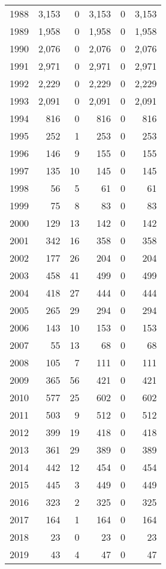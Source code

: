 \documentclass[11pt]{book}
\begin{document}
\begin{longtable}[]{@{}lrrrrr@{}}
1988 & 3,153 & 0 & 3,153 & 0 & 3,153\tabularnewline
1989 & 1,958 & 0 & 1,958 & 0 & 1,958\tabularnewline
1990 & 2,076 & 0 & 2,076 & 0 & 2,076\tabularnewline
1991 & 2,971 & 0 & 2,971 & 0 & 2,971\tabularnewline
1992 & 2,229 & 0 & 2,229 & 0 & 2,229\tabularnewline
1993 & 2,091 & 0 & 2,091 & 0 & 2,091\tabularnewline
1994 & 816 & 0 & 816 & 0 & 816\tabularnewline
1995 & 252 & 1 & 253 & 0 & 253\tabularnewline
1996 & 146 & 9 & 155 & 0 & 155\tabularnewline
1997 & 135 & 10 & 145 & 0 & 145\tabularnewline
1998 & 56 & 5 & 61 & 0 & 61\tabularnewline
1999 & 75 & 8 & 83 & 0 & 83\tabularnewline
2000 & 129 & 13 & 142 & 0 & 142\tabularnewline
2001 & 342 & 16 & 358 & 0 & 358\tabularnewline
2002 & 177 & 26 & 204 & 0 & 204\tabularnewline
2003 & 458 & 41 & 499 & 0 & 499\tabularnewline
2004 & 418 & 27 & 444 & 0 & 444\tabularnewline
2005 & 265 & 29 & 294 & 0 & 294\tabularnewline
2006 & 143 & 10 & 153 & 0 & 153\tabularnewline
2007 & 55 & 13 & 68 & 0 & 68\tabularnewline
2008 & 105 & 7 & 111 & 0 & 111\tabularnewline
2009 & 365 & 56 & 421 & 0 & 421\tabularnewline
2010 & 577 & 25 & 602 & 0 & 602\tabularnewline
2011 & 503 & 9 & 512 & 0 & 512\tabularnewline
2012 & 399 & 19 & 418 & 0 & 418\tabularnewline
2013 & 361 & 29 & 389 & 0 & 389\tabularnewline
2014 & 442 & 12 & 454 & 0 & 454\tabularnewline
2015 & 445 & 3 & 449 & 0 & 449\tabularnewline
2016 & 323 & 2 & 325 & 0 & 325\tabularnewline
2017 & 164 & 1 & 164 & 0 & 164\tabularnewline
2018 & 23 & 0 & 23 & 0 & 23\tabularnewline
2019 & 43 & 4 & 47 & 0 & 47\tabularnewline
\bottomrule
\end{longtable}
\clearpage
\end{document}

